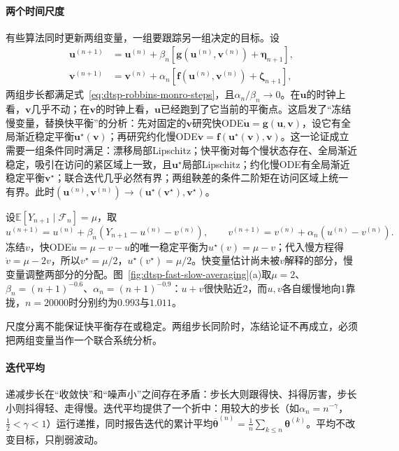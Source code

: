 \paragraph{两个时间尺度}
有些算法同时更新两组变量，一组要跟踪另一组决定的目标。设
\[
  \begin{aligned}
    \bm u^{(n+1)}&=\bm u^{(n)}+\beta_n[\bm g(\bm u^{(n)},\bm v^{(n)})+\bm\eta_{n+1}],\\
    \bm v^{(n+1)}&=\bm v^{(n)}+\alpha_n[\bm f(\bm u^{(n)},\bm v^{(n)})+\bm\zeta_{n+1}],
  \end{aligned}
\]
两组步长都满足式~\eqref{eq:dtsp-robbins-monro-steps}，且$\alpha_n/\beta_n\to0$。在$\bm u$的时钟上看，$\bm v$几乎不动；在$\bm v$的时钟上看，$\bm u$已经跑到了它当前的平衡点。这启发了“冻结慢变量，替换快平衡”的分析：先对固定的$\bm v$研究快ODE$\dot{\bm u}=\bm g(\bm u,\bm v)$，设它有全局渐近稳定平衡$\bm u^\star(\bm v)$；再研究约化慢ODE$\dot{\bm v}=\bm f(\bm u^\star(\bm v),\bm v)$。这一论证成立需要一组条件同时满足：漂移局部Lipschitz；快平衡对每个慢状态存在、全局渐近稳定，吸引在访问的紧区域上一致，且$\bm u^\star$局部Lipschitz；约化慢ODE有全局渐近稳定平衡$\bm v^\star$；联合迭代几乎必然有界；两组鞅差的条件二阶矩在访问区域上统一有界。此时$(\bm u^{(n)},\bm v^{(n)})\to(\bm u^\star(\bm v^\star),\bm v^\star)$。

\begin{example}[快慢更新拆分同一个均值]
  \label{ex:dtsp-two-timescale}
  设$\mathbb E[Y_{n+1}\mid\mathcal F_n]=\mu$，取
  \[
    u^{(n+1)}=u^{(n)}+\beta_n(Y_{n+1}-u^{(n)}-v^{(n)}),\qquad
    v^{(n+1)}=v^{(n)}+\alpha_n(u^{(n)}-v^{(n)}).
  \]
  冻结$v$，快ODE$\dot u=\mu-v-u$的唯一稳定平衡为$u^\star(v)=\mu-v$；代入慢方程得$\dot v=\mu-2v$，所以$v^\star=\mu/2$，$u^\star(v^\star)=\mu/2$。快变量估计尚未被$v$解释的部分，慢变量调整两部分的分配。图~\ref{fig:dtsp-fast-slow-averaging}(a)取$\mu=2$、$\beta_n=(n+1)^{-0.6}$、$\alpha_n=(n+1)^{-0.9}$：$u+v$很快贴近$2$，而$u,v$各自缓慢地向$1$靠拢，$n=20000$时分别约为$0.993$与$1.011$。
\end{example}

尺度分离不能保证快平衡存在或稳定。两组步长同阶时，冻结论证不再成立，必须把两组变量当作一个联合系统分析。

\paragraph{迭代平均}
递减步长在“收敛快”和“噪声小”之间存在矛盾：步长大则跟得快、抖得厉害，步长小则抖得轻、走得慢。迭代平均提供了一个折中：用较大的步长（如$\alpha_n=n^{-\gamma}$，$\frac12<\gamma<1$）运行递推，同时报告迭代的累计平均$\overline{\bm\theta}^{(n)}=\frac1n\sum_{k\leq n}\bm\theta^{(k)}$。平均不改变目标，只削弱波动。

